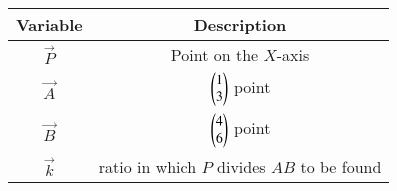 \begin{tabular}[12pt]{ |c| c|}
    \hline
    \textbf{Variable} & \textbf{Description}\\ 
    \hline
    $\vec{P}$ & Point on the $X$-axis\\
    \hline
    $\vec{A}$ & $\begin{pmatrix}1\\3\end{pmatrix}$ point\\
    \hline
    $\vec{B}$ & $\begin{pmatrix}4\\6\end{pmatrix}$ point\\
    \hline
    $\vec{k}$ & ratio in which $P$ divides $AB$ to be found\\
    \hline
\end{tabular}
